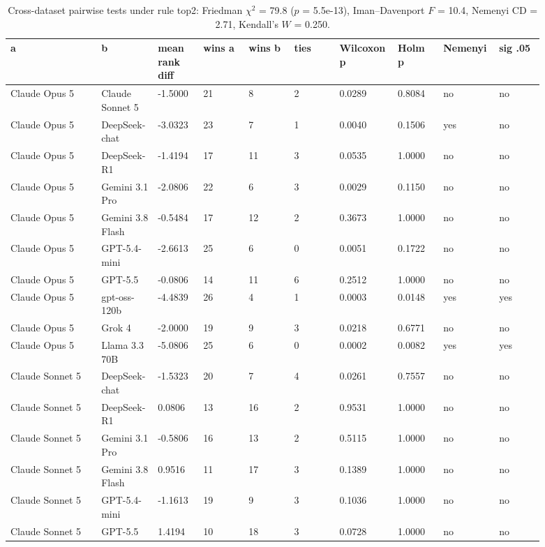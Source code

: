 \begin{landscape}
\tiny
\setlength{\tabcolsep}{3pt}
\begin{longtable}{p{0.162\linewidth}p{0.081\linewidth}p{0.081\linewidth}p{0.081\linewidth}p{0.081\linewidth}p{0.081\linewidth}p{0.081\linewidth}p{0.081\linewidth}p{0.081\linewidth}p{0.081\linewidth}}
\caption{Cross-dataset pairwise tests under rule top2: Friedman $\chi^2$ = 79.8 ($p$ = 5.5e-13), Iman--Davenport $F$ = 10.4, Nemenyi CD = 2.71, Kendall's $W$ = 0.250.}\label{tab:pairwise_top2}\\
\toprule
a & b & mean rank diff & wins a & wins b & ties & Wilcoxon p & Holm p & Nemenyi & sig .05 \\
\midrule
Claude Opus 5 & Claude Sonnet 5 & -1.5000 & 21 & 8 & 2 & 0.0289 & 0.8084 & no & no \\
Claude Opus 5 & DeepSeek-chat & -3.0323 & 23 & 7 & 1 & 0.0040 & 0.1506 & yes & no \\
Claude Opus 5 & DeepSeek-R1 & -1.4194 & 17 & 11 & 3 & 0.0535 & 1.0000 & no & no \\
Claude Opus 5 & Gemini 3.1 Pro & -2.0806 & 22 & 6 & 3 & 0.0029 & 0.1150 & no & no \\
Claude Opus 5 & Gemini 3.8 Flash & -0.5484 & 17 & 12 & 2 & 0.3673 & 1.0000 & no & no \\
Claude Opus 5 & GPT-5.4-mini & -2.6613 & 25 & 6 & 0 & 0.0051 & 0.1722 & no & no \\
Claude Opus 5 & GPT-5.5 & -0.0806 & 14 & 11 & 6 & 0.2512 & 1.0000 & no & no \\
Claude Opus 5 & gpt-oss-120b & -4.4839 & 26 & 4 & 1 & 0.0003 & 0.0148 & yes & yes \\
Claude Opus 5 & Grok 4 & -2.0000 & 19 & 9 & 3 & 0.0218 & 0.6771 & no & no \\
Claude Opus 5 & Llama 3.3 70B & -5.0806 & 25 & 6 & 0 & 0.0002 & 0.0082 & yes & yes \\
Claude Sonnet 5 & DeepSeek-chat & -1.5323 & 20 & 7 & 4 & 0.0261 & 0.7557 & no & no \\
Claude Sonnet 5 & DeepSeek-R1 & 0.0806 & 13 & 16 & 2 & 0.9531 & 1.0000 & no & no \\
Claude Sonnet 5 & Gemini 3.1 Pro & -0.5806 & 16 & 13 & 2 & 0.5115 & 1.0000 & no & no \\
Claude Sonnet 5 & Gemini 3.8 Flash & 0.9516 & 11 & 17 & 3 & 0.1389 & 1.0000 & no & no \\
Claude Sonnet 5 & GPT-5.4-mini & -1.1613 & 19 & 9 & 3 & 0.1036 & 1.0000 & no & no \\
Claude Sonnet 5 & GPT-5.5 & 1.4194 & 10 & 18 & 3 & 0.0728 & 1.0000 & no & no \\

\end{longtable}
\end{landscape}
